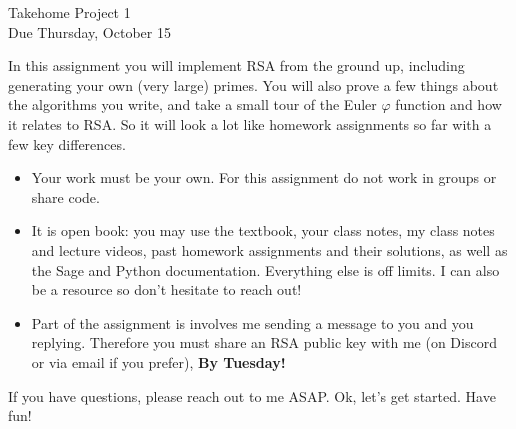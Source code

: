 \documentclass[11pt]{article}
\begin{document}
\begin{center}
\Large {Takehome Project 1}\\
\small {Due Thursday, October 15}
\end{center}
In this assignment you will implement RSA from the ground up, including generating your own (very large) primes.  You will also prove a few things about the algorithms you write, and take a small tour of the Euler $\varphi$ function and how it relates to RSA.  So it will look a lot like homework assignments so far with a few key differences.
\begin{itemize}
  \item{Your work must be your own.  For this assignment do not work in groups or share code.}
  \item{It is open book: you may use the textbook, your class notes, my class notes and lecture videos, past homework assignments and their solutions, as well as the Sage and Python documentation.  Everything else is off limits.  I can also be a resource so don't hesitate to reach out!}
  \item{Part of the assignment is involves me sending a message to you and you replying.  Therefore you must share an RSA public key with me (on Discord or via email if you prefer), \textbf{By Tuesday!}}
\end{itemize}
If you have questions, please reach out to me ASAP.  Ok, let's get started.  Have fun!
\end{document}
